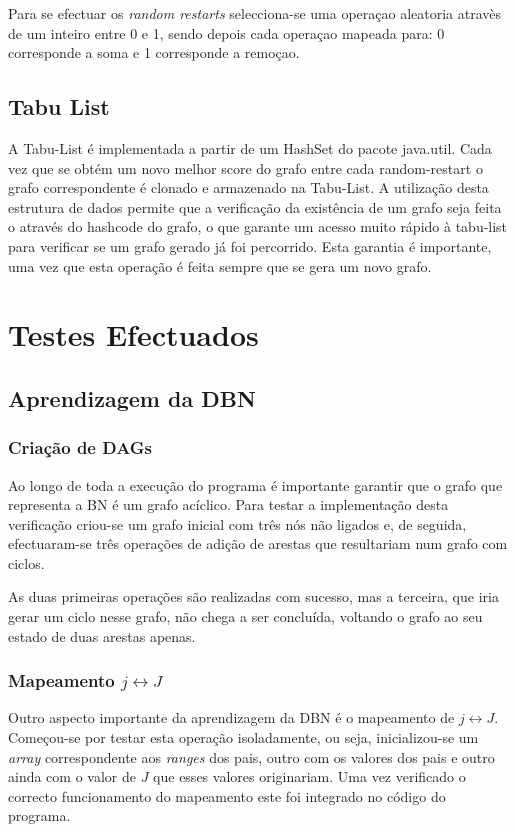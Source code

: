 \documentclass[10pt]{article}
\numberwithin{equation}{section}
\begin{document}
Para se efectuar os \textit{random restarts} selecciona-se uma operaçao aleatoria atravès de um inteiro entre 0 e 1, sendo depois cada operaçao mapeada para: 0 corresponde a soma e 1 corresponde a remoçao.

\subsection{Tabu List}

A Tabu-List é implementada a partir de um HashSet do pacote java.util. Cada vez que se obtém um novo melhor score do grafo entre cada random-restart o grafo correspondente é clonado e armazenado na Tabu-List. A utilização desta estrutura de dados permite que a verificação da existência de um grafo seja feita o através do hashcode do grafo, o que garante um acesso muito rápido à tabu-list para verificar se um grafo gerado já foi percorrido. Esta garantia é importante, uma vez que esta operação é feita sempre que se gera um novo grafo.

\section{Testes Efectuados}
\subsection{Aprendizagem da DBN}

\subsubsection{Criação de DAGs}

Ao longo de toda a execução do programa é importante garantir que o grafo que representa a BN é um grafo acíclico. Para testar a implementação desta verificação criou-se um grafo inicial com três nós não ligados e, de seguida, efectuaram-se três operações de adição de arestas que resultariam num grafo com ciclos. 

As duas primeiras operações são realizadas com sucesso, mas a terceira, que iria gerar um ciclo nesse grafo, não chega a ser concluída, voltando o grafo ao seu estado de duas arestas apenas. 

\subsubsection{Mapeamento $j \leftrightarrow J$}

Outro aspecto importante da aprendizagem da DBN é o mapeamento de $j \leftrightarrow J$. Começou-se por testar esta operação isoladamente, ou seja, inicializou-se um \textit{array} correspondente aos \textit{ranges} dos pais, outro com os valores dos pais e outro ainda com o valor de $J$ que esses valores originariam. Uma vez verificado o correcto funcionamento do mapeamento este foi integrado no código do programa.
\end{document}
